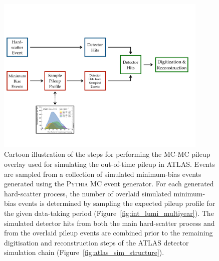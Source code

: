 \begin{figure}[!htb]
    \begin{center}
        \includegraphics[width=0.9\textwidth]{figures/event_simulation/pileup_illustrationPDF}
        \caption{
            Cartoon illustration of the steps for performing the MC-MC pileup overlay used
            for simulating the out-of-time pileup in ATLAS.
            Events are sampled from a collection of simulated minimum-bias events generated using the
            \textsc{Pythia} MC event generator.
            For each generated hard-scatter process, the number of overlaid simulated minimum-bias events is
            determined by sampling the expected pileup profile for the given data-taking period (Figure~\ref{fig:int_lumi_multiyear}).
            The simulated detector hits from both the main hard-scatter process and from
            the overlaid pileup events are combined prior to the remaining digitisation and reconstruction
            steps of the ATLAS detector simulation chain (Figure~\ref{fig:atlas_sim_structure}).
        }
        \label{fig:pileup_gen}
    \end{center}
\end{figure}

\FloatBarrier
